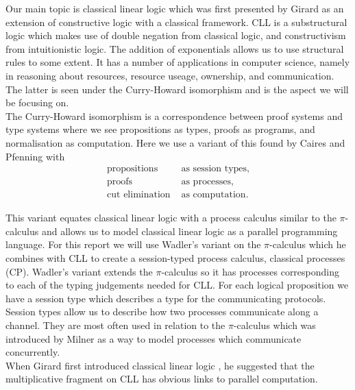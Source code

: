 \noindent
Our main topic is classical linear logic which was first presented by Girard as an extension of constructive logic 
with a classical framework. CLL is a substructural logic which makes use of double negation from classical logic, and 
constructivism from intuitionistic logic. The addition of exponentials allows us to use structural rules to some extent. 
It has a number of applications in computer science, namely in reasoning about resources, resource useage, ownership, 
and communication. The latter is seen under the Curry-Howard isomorphism and is the aspect we will be focusing on. \\

\noindent
The Curry-Howard isomorphism is a correspondence between proof systems and type systems where we see propositions as 
types, proofs as programs, and normalisation as computation. Here we use a variant of this found by Caires and Pfenning 
\cite{caires2010} with 
\begin{align*}
    \text{propositions }& \text{as session types,} \\
    \text{proofs } & \text{as processes,} \\
    \text{cut elimination } & \text{as computation.} 
\end{align*}

\noindent
This variant equates classical linear logic with a process calculus similar to the $\pi$-calculus and allows 
us to model classical linear logic as a parallel programming language. For this report we will use Wadler's 
\cite{wadler2014} variant on the $\pi$-calculus which he combines with CLL to create a session-typed process calculus, 
classical processes (CP). Wadler's variant extends the $\pi$-calculus so it has processes corresponding to 
each of the typing judgements needed for CLL. For each logical proposition we have a session type which 
describes a type for the communicating protocols. Session types  allow us to describe how two processes 
communicate along a channel. They are most often used in relation to the $\pi$-calculus which was introduced 
by Milner \cite{milner1992} as a way to model processes which communicate concurrently. \\

\noindent
When Girard first introduced classical linear logic \cite{girard1987}, he suggested that the multiplicative fragment 
on CLL has obvious links to parallel computation. 

